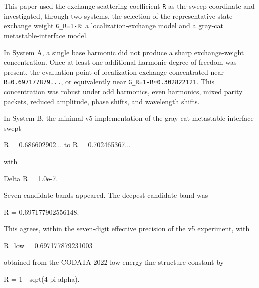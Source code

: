 \documentclass[
]{article}
\newenvironment{Shaded}{}{}
\newcommand{\NormalTok}[1]{#1}
\begin{document}
This paper used the exchange-scattering coefficient \texttt{R} as the
sweep coordinate and investigated, through two systems, the selection of
the representative state-exchange weight \texttt{G\_R=1-R}: a
localization-exchange model and a gray-cat metastable-interface model.

In System A, a single base harmonic did not produce a sharp
exchange-weight concentration. Once at least one additional harmonic
degree of freedom was present, the evaluation point of localization
exchange concentrated near \texttt{R=0.697177879...}, or equivalently
near \texttt{G\_R=1-R≈0.302822121}. This concentration was robust under
odd harmonics, even harmonics, mixed parity packets, reduced amplitude,
phase shifts, and wavelength shifts.

In System B, the minimal v5 implementation of the gray-cat metastable
interface swept

\begin{Shaded}
\begin{Highlighting}[]
\NormalTok{R = 0.686602902... to R = 0.702465367...}
\end{Highlighting}
\end{Shaded}

with

\begin{Shaded}
\begin{Highlighting}[]
\NormalTok{Delta R = 1.0e{-}7.}
\end{Highlighting}
\end{Shaded}

Seven candidate bands appeared. The deepest candidate band was

\begin{Shaded}
\begin{Highlighting}[]
\NormalTok{R = 0.697177902556148.}
\end{Highlighting}
\end{Shaded}

This agrees, within the seven-digit effective precision of the v5
experiment, with

\begin{Shaded}
\begin{Highlighting}[]
\NormalTok{R\_low = 0.697177879231003}
\end{Highlighting}
\end{Shaded}

obtained from the CODATA 2022 low-energy fine-structure constant by

\begin{Shaded}
\begin{Highlighting}[]
\NormalTok{R = 1 {-} sqrt(4 pi alpha).}
\end{Highlighting}
\end{Shaded}
\end{document}
